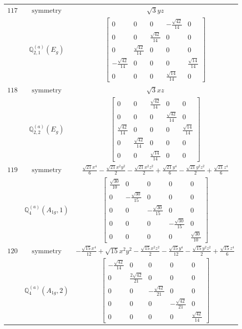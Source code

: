 \documentclass[fleqn,8pt,landscape]{jsarticle}
\begin{document}
\begin{longtable}{ccc}
$ 117 $ & $ \text{symmetry} $ & $ \sqrt{3} y z $ \\
$  $ & $ \mathbb{Q}_{2,1}^{(a)}(E_{g}) $ & $ \begin{bmatrix} 0 & 0 & 0 & - \frac{\sqrt{42}}{14} & 0 \\ 0 & 0 & \frac{\sqrt{42}}{14} & 0 & 0 \\ 0 & \frac{\sqrt{42}}{14} & 0 & 0 & 0 \\ - \frac{\sqrt{42}}{14} & 0 & 0 & 0 & \frac{\sqrt{14}}{14} \\ 0 & 0 & 0 & \frac{\sqrt{14}}{14} & 0 \end{bmatrix} $ \\ \hline
$ 118 $ & $ \text{symmetry} $ & $ \sqrt{3} x z $ \\
$  $ & $ \mathbb{Q}_{2,2}^{(a)}(E_{g}) $ & $ \begin{bmatrix} 0 & 0 & \frac{\sqrt{42}}{14} & 0 & 0 \\ 0 & 0 & 0 & \frac{\sqrt{42}}{14} & 0 \\ \frac{\sqrt{42}}{14} & 0 & 0 & 0 & \frac{\sqrt{14}}{14} \\ 0 & \frac{\sqrt{42}}{14} & 0 & 0 & 0 \\ 0 & 0 & \frac{\sqrt{14}}{14} & 0 & 0 \end{bmatrix} $ \\ \hline
$ 119 $ & $ \text{symmetry} $ & $ \frac{\sqrt{21} x^{4}}{6} - \frac{\sqrt{21} x^{2} y^{2}}{2} - \frac{\sqrt{21} x^{2} z^{2}}{2} + \frac{\sqrt{21} y^{4}}{6} - \frac{\sqrt{21} y^{2} z^{2}}{2} + \frac{\sqrt{21} z^{4}}{6} $ \\
$  $ & $ \mathbb{Q}_{4}^{(a)}(A_{1g},1) $ & $ \begin{bmatrix} \frac{\sqrt{30}}{10} & 0 & 0 & 0 & 0 \\ 0 & - \frac{\sqrt{30}}{15} & 0 & 0 & 0 \\ 0 & 0 & - \frac{\sqrt{30}}{15} & 0 & 0 \\ 0 & 0 & 0 & - \frac{\sqrt{30}}{15} & 0 \\ 0 & 0 & 0 & 0 & \frac{\sqrt{30}}{10} \end{bmatrix} $ \\ \hline
$ 120 $ & $ \text{symmetry} $ & $ - \frac{\sqrt{15} x^{4}}{12} + \sqrt{15} x^{2} y^{2} - \frac{\sqrt{15} x^{2} z^{2}}{2} - \frac{\sqrt{15} y^{4}}{12} - \frac{\sqrt{15} y^{2} z^{2}}{2} + \frac{\sqrt{15} z^{4}}{6} $ \\
$  $ & $ \mathbb{Q}_{4}^{(a)}(A_{1g},2) $ & $ \begin{bmatrix} - \frac{\sqrt{42}}{14} & 0 & 0 & 0 & 0 \\ 0 & \frac{2 \sqrt{42}}{21} & 0 & 0 & 0 \\ 0 & 0 & - \frac{\sqrt{42}}{21} & 0 & 0 \\ 0 & 0 & 0 & - \frac{\sqrt{42}}{21} & 0 \\ 0 & 0 & 0 & 0 & \frac{\sqrt{42}}{14} \end{bmatrix} $ \\ \hline

\end{longtable}
\end{document}
